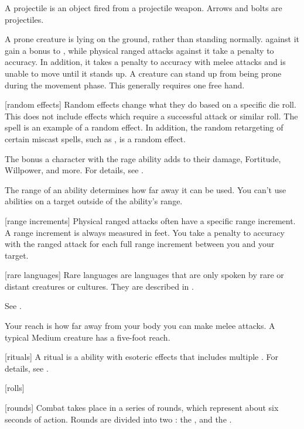  A projectile is an object fired from a projectile weapon.
Arrows and bolts are projectiles.

 A prone creature is lying on the ground, rather than standing normally.
 against it gain a  bonus to , while physical ranged attacks against it take a  penalty to accuracy.
In addition, it takes a  penalty to accuracy with melee attacks and is unable to move until it stands up.
A creature can stand up from being prone during the movement phase.
This generally requires one free hand.

[random effects] Random effects change what they do based on a specific die roll.
This does not include effects which require a successful attack or similar roll.
The  spell is an example of a random effect.
In addition, the random retargeting of certain miscast spells, such as , is a random effect.

 The bonus a character with the rage ability adds to their damage, Fortitude, Willpower, and more.
For details, see .

 The range of an ability determines how far away it can be used.
You can't use abilities on a target outside of the ability's range.

[range increments] Physical ranged attacks often have a specific range increment.
A range increment is always measured in feet.
You take a  penalty to accuracy with the ranged attack for each full range increment between you and your target.

[rare languages] Rare languages are languages that are only spoken by rare or distant creatures or cultures.
They are described in .

 See .

 Your reach is how far away from your body you can make melee attacks.
A typical Medium creature has a five-foot reach.

[rituals] A ritual is a  ability with esoteric effects that includes multiple .
For details, see .

[rolls] 

[rounds] Combat takes place in a series of rounds, which represent about six seconds of action.
Rounds are divided into two : the , and the .

